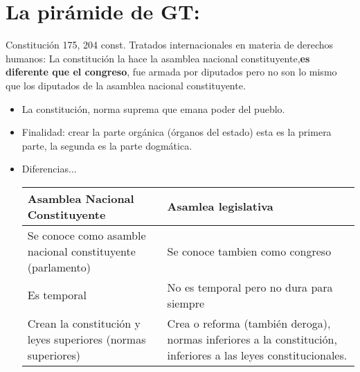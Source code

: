 \section{La pirámide de GT:}
\begin{etaremune}
    \item Constitución 175, 204 const. Tratados internacionales en materia de derechos humanos: La constitución la hace la asamblea nacional constituyente,\textbf{es diferente que el congreso}, fue armada por diputados pero no son lo mismo que los diputados de la asamblea nacional constituyente. 
    \begin{itemize}
        \item La constitución, norma suprema que emana poder del pueblo.
        \item Finalidad: crear la parte orgánica (órganos del estado) esta es la primera parte, la segunda es la parte dogmática.
        \item Diferencias... 
            \begin{center}
            \begin{tabular}{ | p{5cm} | p{5cm} | }
                \hline
                Asamblea Nacional Constituyente & Asamlea legislativa \\ 
                \hline
                Se conoce como asamble nacional constituyente (parlamento) & Se conoce tambien como congreso \\
                Es temporal & No es temporal pero no dura para siempre \\ 
                Crean la constitución y leyes superiores (normas superiores) & Crea o reforma (también deroga), normas inferiores a la constitución, inferiores a las leyes constitucionales. \\ 
                \hline
            \end{tabular}
            \end{center}
        

\end{itemize}
\end{etaremune}
